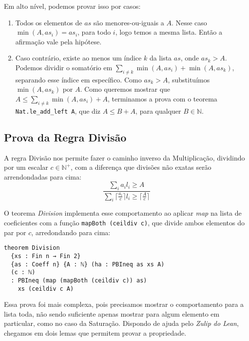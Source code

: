 \documentclass[conference]{IEEEtran}
\begin{document}
Em alto nível, podemos provar isso por casos:
\begin{enumerate}
    \item Todos os elementos de $as$ são menores-ou-iguais a $A$.
          Nesse caso $\min(A,as_i) = as_i$, para todo $i$, logo temos a mesma lista.
          Então a afirmação vale pela hipótese.
    \item Caso contrário, existe ao menos um índice $k$ da lista $as$, onde $as_k > A$.
          Podemos dividir o somatório em $\sum_{i\neq k}{\min(A,as_i) + \min(A,as_k)}$, separando esse índice em específico.
          Como $as_k > A$, substituímos $\min(A,as_k)$ por $A$.
          Como queremos mostrar que $A \le \sum_{i\neq k}{\min(A,as_i) + A}$,
          terminamos a prova com o teorema \texttt{Nat.le\_add\_left A}, que diz
          $A \le B + A$, para qualquer $B \in \mathbb{N}$.

\end{enumerate}


\subsection{Prova da Regra Divisão}
A regra Divisão nos permite fazer o caminho inverso da Multiplicação, dividindo por um escalar $c \in \mathbb{N}^+$, com a diferença que divisões não exatas serão arrendondadas
para cima:
\begin{equation}
    \frac
    {\sum_i{a_i l_i} \ge A}
    {\sum_i{ \lceil \frac{a_i}{c} \rceil l_i} \ge \lceil \frac{A}{c} \rceil}
\end{equation}

O teorema \textit{Division} implementa esse comportamento ao aplicar \textit{map} na lista de coeficientes com a função
\texttt{mapBoth (ceildiv c)}, que divide ambos elementos do par por $c$, arredondando para cima:
\begin{verbatim}
theorem Division
  {xs : Fin n → Fin 2}
  {as : Coeff n} {A : ℕ} (ha : PBIneq as xs A)
  (c : ℕ)
  : PBIneq (map (mapBoth (ceildiv c)) as)
    xs (ceildiv c A)
\end{verbatim}

Essa prova foi mais complexa, pois precisamos mostrar o comportamento para a lista toda,
não sendo suficiente apenas mostrar para algum elemento em particular, como no caso da Saturação.
Dispondo de ajuda pelo \textit{Zulip do Lean}, chegamos em dois lemas que permitem provar a propriedade.
\end{document}
